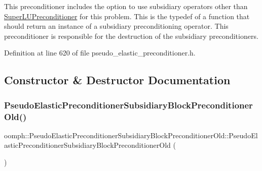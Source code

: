This preconditioner includes the option to use subsidiary operators other than \hyperlink{classoomph_1_1SuperLUPreconditioner}{Super\+L\+U\+Preconditioner} for this problem. This is the typedef of a function that should return an instance of a subsidiary preconditioning operator. This preconditioner is responsible for the destruction of the subsidiary preconditioners. 



Definition at line 620 of file pseudo\+\_\+elastic\+\_\+preconditioner.\+h.



\subsection{Constructor \& Destructor Documentation}
\mbox{\label{classoomph_1_1PseudoElasticPreconditionerSubsidiaryBlockPreconditionerOld_a270a6c5fc522dc82196e89bc6ece086d}} 
\subsubsection{\texorpdfstring{Pseudo\+Elastic\+Preconditioner\+Subsidiary\+Block\+Preconditioner\+Old()}{PseudoElasticPreconditionerSubsidiaryBlockPreconditionerOld()}\hspace{0.1cm}{\footnotesize\ttfamily [1/2]}}
{\footnotesize\ttfamily oomph\+::\+Pseudo\+Elastic\+Preconditioner\+Subsidiary\+Block\+Preconditioner\+Old\+::\+Pseudo\+Elastic\+Preconditioner\+Subsidiary\+Block\+Preconditioner\+Old (\begin{DoxyParamCaption}{ }\end{DoxyParamCaption})\hspace{0.3cm}{\ttfamily [inline]}}



